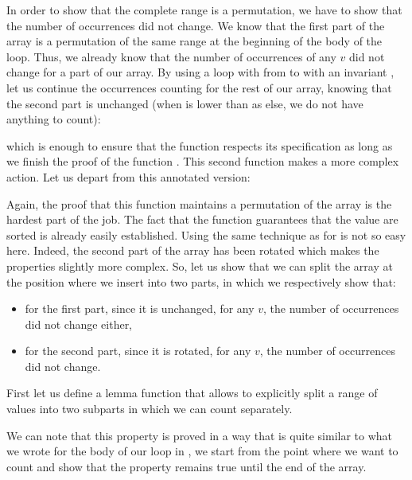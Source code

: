 In order to show that the complete range is a permutation, we have to show that
the number of occurrences did not change. We know that the first part of the
array is a permutation of the same range at the beginning of the body of the loop.
Thus, we already know that the number of occurrences of any $v$ did not change
for a part of our array. By using a loop with  from 
to  with an invariant ,
let us continue the occurrences counting for the rest of our array, knowing that
the second part is unchanged (when  is lower than 
as else, we do not have anything to count):




which is enough to ensure that the  function
respects its specification as long as we finish the proof of the function
. This second function makes a more complex action. Let us
depart from this annotated version:




Again, the proof that this function maintains a permutation of the array is
the hardest part of the job. The fact that the function guarantees that the
value are sorted is already easily established. Using the same technique as
for  is not so easy here. Indeed, the second part
of the array has been rotated which makes the properties slightly more
complex. So, let us show that we can split the array at the position where
we insert into two parts, in which we respectively show that:

\begin{itemize}
\item for the first part, since it is unchanged, for any $v$, the number of
  occurrences did not change either,
\item for the second part, since it is rotated, for any $v$, the number of
  occurrences did not change.
\end{itemize}

First let us define a lemma function that allows to explicitly split a range of
values into two subparts in which we can count separately.




We can note that this property is proved in a way that is quite similar to what
we wrote for the body of our loop in , we start from
the point where we want to count and show that the property remains true until
the end of the array.



